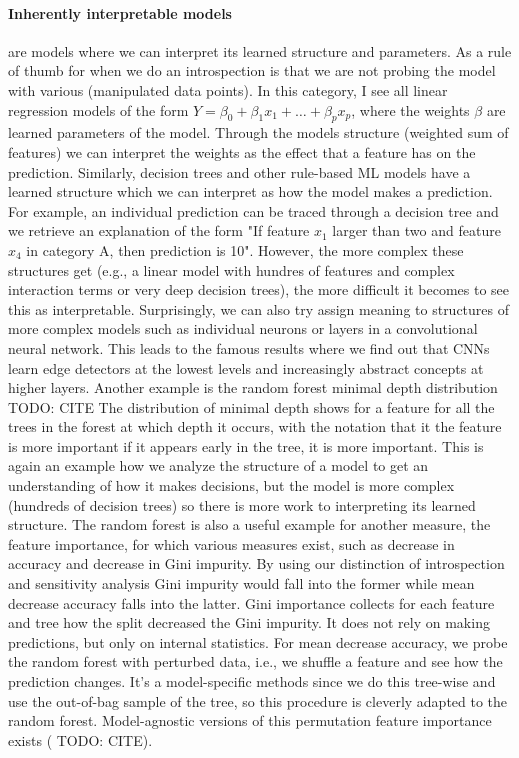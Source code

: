 \documentclass[runningheads]{llncs}
\begin{document}
\paragraph{Inherently interpretable models} are models where we can interpret its learned structure and parameters.
As a rule of thumb for when we do an introspection is that we are not probing the model with various (manipulated data points).
In this category, I see all linear regression models of the form $Y = \beta_0 + \beta_1 x_1 + \ldots + \beta_p x_p$, where the weights $\beta$ are learned parameters of the model.
Through the models structure (weighted sum of features) we can interpret the weights as the effect that a feature has on the prediction.
Similarly, decision trees and other rule-based ML models have a learned structure which we can interpret as how the model makes a prediction.
For example, an individual prediction can be traced through a decision tree and we retrieve an explanation of the form "If feature $x_1$ larger than two and feature $x_4$ in category A, then prediction is 10".
However, the more complex these structures get (e.g., a linear model with hundres of features and complex interaction terms or very deep decision trees), the more difficult it becomes to see this as interpretable.
Surprisingly, we can also try assign meaning to structures of more complex models such as individual neurons or layers in a convolutional neural network.
This leads to the famous results where we find out that CNNs learn edge detectors at the lowest levels and increasingly abstract concepts at higher layers.
Another example is the random forest minimal depth distribution TODO: CITE
The distribution of minimal depth shows for a feature for all the trees in the forest at which depth it occurs, with the notation that it the feature is more important if it appears early in the tree, it is more important.
This is again an example how we analyze the structure of a model to get an understanding of how it makes decisions, but the model is more complex (hundreds of decision trees) so there is more work to interpreting its learned structure.
The random forest is also a useful example for another measure, the feature importance, for which various measures exist, such as decrease in accuracy and decrease in Gini impurity.
By using our distinction of introspection and sensitivity analysis Gini impurity would fall into the former while mean decrease accuracy falls into the latter.
Gini importance collects for each feature and tree how the split decreased the Gini impurity.
It does not rely on making predictions, but only on internal statistics.
For mean decrease accuracy, we probe the random forest with perturbed data, i.e., we shuffle a feature and see how the prediction changes.
It's a model-specific methods since we do this tree-wise and use the out-of-bag sample of the tree, so this procedure is cleverly adapted to the random forest.
Model-agnostic versions of this permutation feature importance exists ( TODO: CITE).
\end{document}
